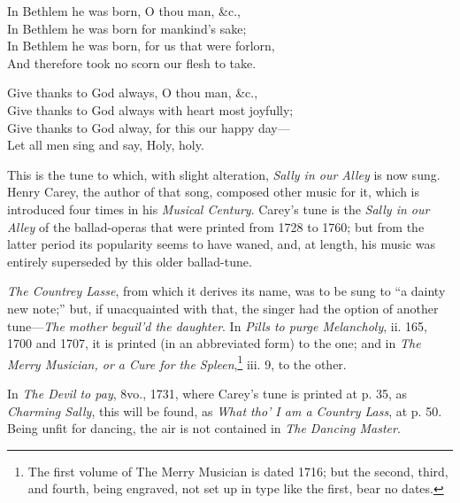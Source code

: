 \begin{dcverse}
\begin{altverse}
In Bethlem he was born, O thou man, \&c.,\\
In Bethlem he was born for mankind’s sake;\\
In Bethlem he was born, for us that were forlorn,\\
And therefore took no scorn our flesh to take.
\end{altverse}

\begin{altverse}
Give thanks to God always, O thou man, \&c.,\\
Give thanks to God always with heart most joyfully;\\
Give thanks to God alway, for this our happy day—\\
Let all men sing and say, Holy, holy.
\end{altverse}
\end{dcverse}

\pagebreak%



This is the tune to which, with slight alteration, \textit{Sally in our Alley} is now sung.
Henry Carey, the author of that song, composed other music for it, which is
introduced four times in his \textit{Musical Century}. Carey’s tune is the \textit{Sally in our
Alley} of the ballad-operas that were printed from 1728 to 1760; but from the
latter period its popularity seems to have waned, and, at length, his music was
entirely superseded by this older ballad-tune.

\textit{The Countrey Lasse}, from which it derives its name, was to be sung to “a dainty
new note;” but, if unacquainted with that, the singer had the option of another
tune—\textit{The mother beguil’d the daughter}. In \textit{ Pills to purge Melancholy}, ii. 165,
1700 and 1707, it is printed (in an abbreviated form) to the one; and in \textit{The
Merry Musician, or a Cure for the Spleen},\footnote{\textit{}
The first volume of The Merry Musician is dated
1716; but the second, third, and fourth, being engraved,
not set up in type like the first, bear no dates.}
 iii. 9, to the other.

In \textit{The Devil to pay}, 8vo., 1731, where Carey’s tune is printed at p. 35, as
\textit{Charming Sally}, this will be found, as \textit{What tho’ I am a Country Lass}, at p. 50.
Being unfit for dancing, the air is not contained in \textit{The Dancing Master}.

